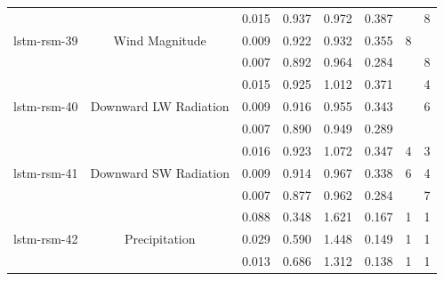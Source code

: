 \begin{table}[H]
\begin{tabular}{c|c|c|c|c|c|c|c }
\hline
        \multirow{3}{6em}{lstm-rsm-39} & \multirow{3}{8em}{Wind Magnitude} & 0.015 & 0.937 & 0.972 & 0.387 & & 8 \\ & & 0.009 & 0.922 & 0.932 & 0.355 & 8 \\ & & 0.007 & 0.892 & 0.964 & 0.284 & & 8\\
\hline
        \multirow{3}{6em}{lstm-rsm-40} & \multirow{3}{8em}{Downward LW Radiation} & 0.015 & 0.925 & 1.012 & 0.371 & & 4 \\ & & 0.009 & 0.916 & 0.955 & 0.343 & & 6 \\ & & 0.007 & 0.890 & 0.949 & 0.289 & & \\
%
\hline
        \multirow{3}{6em}{lstm-rsm-41} & \multirow{3}{8em}{Downward SW Radiation} & 0.016 & 0.923 & 1.072 & 0.347 & 4 & 3 \\ & & 0.009 & 0.914 & 0.967 & 0.338 & 6 & 4 \\ & & 0.007 & 0.877 & 0.962 & 0.284 & & 7 \\
\hline
        \multirow{3}{6em}{lstm-rsm-42} & \multirow{3}{8em}{Precipitation} & 0.088 & 0.348 & 1.621 & 0.167 & 1 & 1 \\ & & 0.029 & 0.590 & 1.448 & 0.149 & 1 & 1 \\ & & 0.013 & 0.686 & 1.312 & 0.138 & 1 & 1 \\

\end{tabular}
\end{table}
